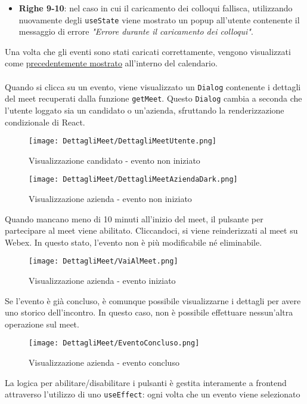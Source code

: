 \begin{itemize}
    \item \textbf{Righe 9-10}: nel caso in cui il caricamento dei colloqui fallisca,
    utilizzando nuovamente degli \texttt{useState} viene mostrato un popup all'utente 
    contenente il messaggio di errore \textit{"Errore durante il caricamento dei colloqui"}.
\end{itemize}
Una volta che gli eventi sono stati caricati correttamente, vengono visualizzati come 
\hyperref[fig:visualizzazioneCalendario]{precedentemente mostrato} all'interno del calendario.
\\
\\
Quando si clicca su un evento, viene visualizzato un \texttt{Dialog} contenente i dettagli 
del meet recuperati dalla funzione \texttt{getMeet}.
Questo \texttt{Dialog} cambia a seconda che l'utente loggato sia un candidato o un'azienda, sfruttando 
la renderizzazione condizionale di React. \cite{reactConditionalRendering}
\begin{figure}[H]
    \centering
    \texttt{[image: DettagliMeet/DettagliMeetUtente.png]}
    \caption{Visualizzazione candidato - evento non iniziato}
\end{figure}
\begin{figure}[H]
    \centering
    \texttt{[image: DettagliMeet/DettagliMeetAziendaDark.png]}
    \caption{Visualizzazione azienda - evento non iniziato}
\end{figure}
\clearpage
\noindent Quando mancano meno di 10 minuti all'inizio del meet, il pulsante per partecipare 
al meet viene abilitato. Cliccandoci, si viene reinderizzati al meet su Webex.
In questo stato, l'evento non è più modificabile né eliminabile.
\begin{figure}[H]
    \centering
    \texttt{[image: DettagliMeet/VaiAlMeet.png]}
    \caption{Visualizzazione azienda - evento iniziato}
\end{figure}
\noindent Se l'evento è già concluso, è comunque possibile visualizzarne i dettagli 
per avere uno storico dell'incontro. In questo caso, non è possibile effettuare 
nessun'altra operazione sul meet.
\begin{figure}[H]
    \centering
    \texttt{[image: DettagliMeet/EventoConcluso.png]}
    \caption{Visualizzazione azienda - evento concluso}
\end{figure}
\noindent La logica per abilitare/disabilitare i pulsanti è gestita interamente a frontend 
attraverso l'utilizzo di uno \texttt{useEffect}: ogni volta che un evento viene selezionato
